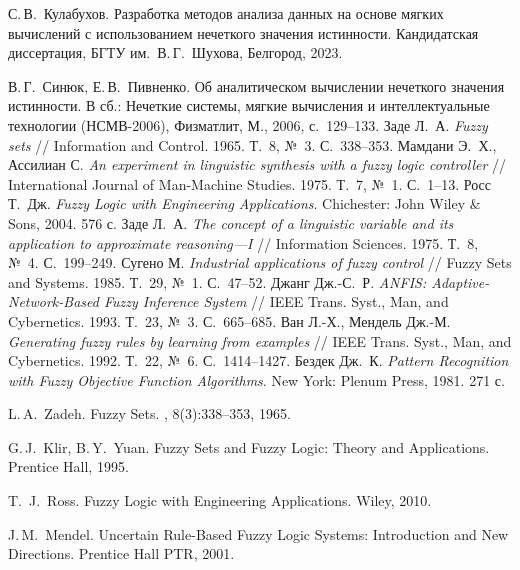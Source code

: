 \eskdrerun{}

\begin{thebibliography}{200}
С.\,В.~Кулабухов.
\newblock Разработка методов анализа данных на основе мягких вычислений
  с использованием нечеткого значения истинности.
\newblock Кандидатская диссертация, БГТУ им.~В.\,Г.~Шухова, Белгород, 2023.

В.\,Г.~Синюк, Е.\,В.~Пивненко.
\newblock Об аналитическом вычислении нечеткого значения истинности.
\newblock В сб.: Нечеткие системы, мягкие вычисления и интеллектуальные технологии (НСМВ-2006), Физматлит, М., 2006, с.~129–133.
  Заде Л.~А. \emph{Fuzzy sets} // Information and Control. 1965. Т.~8, №~3. С.~338--353.
  Мамдани Э.~Х., Ассилиан С. \emph{An experiment in linguistic synthesis with a fuzzy logic controller} // International Journal of Man-Machine Studies. 1975. Т.~7, №~1. С.~1--13.
  Росс Т.~Дж. \emph{Fuzzy Logic with Engineering Applications}. Chichester: John Wiley \& Sons, 2004. 576 с.
  Заде Л.~А. \emph{The concept of a linguistic variable and its application to approximate reasoning—I} // Information Sciences. 1975. Т.~8, №~4. С.~199--249.
  Сугено М. \emph{Industrial applications of fuzzy control} // Fuzzy Sets and Systems. 1985. Т.~29, №~1. С.~47--52.
  Джанг Дж.-С.~Р. \emph{ANFIS: Adaptive-Network-Based Fuzzy Inference System} // IEEE Trans. Syst., Man, and Cybernetics. 1993. Т.~23, №~3. С.~665--685.
  Ван Л.-Х., Мендель Дж.-М. \emph{Generating fuzzy rules by learning from examples} // IEEE Trans. Syst., Man, and Cybernetics. 1992. Т.~22, №~6. С.~1414--1427.
  Бездек Дж.~К. \emph{Pattern Recognition with Fuzzy Objective Function Algorithms}. New York: Plenum Press, 1981. 271 с.

L.\,A.~Zadeh.
\newblock Fuzzy Sets.
, 8(3):338–353, 1965.

G.\,J.~Klir, B.\,Y.~Yuan.
\newblock Fuzzy Sets and Fuzzy Logic: Theory and Applications.
\newblock Prentice Hall, 1995.

T.~J.~Ross.
\newblock Fuzzy Logic with Engineering Applications.
\newblock Wiley, 2010.

J.\,M.~Mendel.
\newblock Uncertain Rule-Based Fuzzy Logic Systems: Introduction and New Directions.
\newblock Prentice Hall PTR, 2001.


\end{thebibliography}
